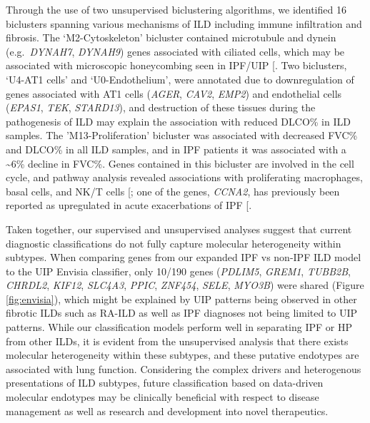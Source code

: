 \documentclass[
]{article}
\begin{document}
Through the use of two unsupervised biclustering algorithms, we identified 16 biclusters spanning various mechanisms of ILD including immune infiltration and fibrosis. The `M2-Cytoskeleton' bicluster contained microtubule and dynein (e.g.~\textit{DYNAH7}, \textit{DYNAH9}) genes associated with ciliated cells, which may be associated with microscopic honeycombing seen in IPF/UIP {[}\citeproc{ref-yang_expression_2013}{65}{]}. Two biclusters, `U4-AT1 cells' and `U0-Endothelium', were annotated due to downregulation of genes associated with AT1 cells (\textit{AGER}, \textit{CAV2}, \textit{EMP2}) and endothelial cells (\textit{EPAS1}, \textit{TEK}, \textit{STARD13}), and destruction of these tissues during the pathogenesis of ILD may explain the association with reduced DLCO\% in ILD samples. The 'M13-Proliferation' bicluster was associated with decreased FVC\% and DLCO\% in all ILD samples, and in IPF patients it was associated with a \textasciitilde6\% decline in FVC\%. Genes contained in this bicluster are involved in the cell cycle, and pathway analysis revealed associations with proliferating macrophages, basal cells, and NK/T cells {[}\citeproc{ref-travaglini_molecular_2020}{96}{]}; one of the genes, \textit{CCNA2}, has previously been reported as upregulated in acute exacerbations of IPF {[}\citeproc{ref-konishi_gene_2009}{75}{]}.

Taken together, our supervised and unsupervised analyses suggest that current diagnostic classifications do not fully capture molecular heterogeneity within subtypes. When comparing genes from our expanded IPF vs non-IPF ILD model to the UIP Envisia classifier, only 10/190 genes (\textit{PDLIM5}, \textit{GREM1}, \textit{TUBB2B}, \textit{CHRDL2}, \textit{KIF12}, \textit{SLC4A3}, \textit{PPIC}, \textit{ZNF454}, \textit{SELE}, \textit{MYO3B}) were shared (Figure \ref{fig:envisia}), which might be explained by UIP patterns being observed in other fibrotic ILDs such as RA-ILD as well as IPF diagnoses not being limited to UIP patterns. While our classification models perform well in separating IPF or HP from other ILDs, it is evident from the unsupervised analysis that there exists molecular heterogeneity within these subtypes, and these putative endotypes are associated with lung function. Considering the complex drivers and heterogenous presentations of ILD subtypes, future classification based on data-driven molecular endotypes may be clinically beneficial with respect to disease management as well as research and development into novel therapeutics.
\end{document}
